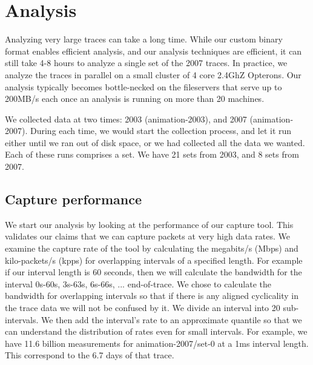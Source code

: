 \section{Analysis}
\label{sec:analysis}

Analyzing very large traces can take a long time.  While our custom
binary format enables efficient analysis, and our analysis techniques
are efficient, it can still take 4-8 hours to analyze a single set of
the 2007 traces.  In practice, we analyze the traces in parallel on a
small cluster of 4 core 2.4GhZ Opterons.  Our analysis typically
becomes bottle-necked on the fileservers that serve up to 200MB/s each
once an analysis is running on more than 20 machines.

We collected data at two times: 2003 (animation-2003), and 2007
(animation-2007).  During each time, we would start the collection
process, and let it run either until we ran out of disk space, or we
had collected all the data we wanted.  Each of these runs comprises a
set.  We have 21 sets from 2003, and 8 sets from 2007.


\subsection{Capture performance}

We start our analysis by looking at the performance of our capture
tool.  This validates our claims that we can capture packets at very
high data rates.  We examine the capture rate of the tool by
calculating the megabits/s (Mbps) and kilo-packets/s (kpps) for
overlapping intervals of a specified length.  For example if our
interval length is 60 seconds, then we will calculate the bandwidth
for the interval 0s-60s, 3s-63s, 6s-66s, ... end-of-trace.  We chose
to calculate the bandwidth for overlapping intervals so that if there
is any aligned cyclicality in the trace data we will not be confused
by it.  We divide an interval into 20 sub-intervals.  We then add the
interval's rate to an approximate quantile so that we can understand
the distribution of rates even for small intervals.  For example, we
have 11.6 billion measurements for animation-2007/set-0 at a 1ms interval
length.  This correspond to the 6.7 days of that trace.

